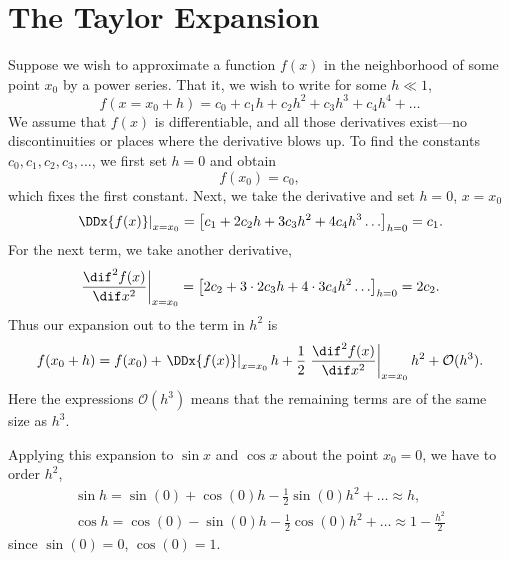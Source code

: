 \section{The Taylor Expansion}\label{s.taylor-expansion}
Suppose we wish to approximate a function $f(x)$ in the neighborhood of some point $x_{0}$ by a power series.  That it, we wish to write for some $h \ll 1$,
\[
 f(x = x_{0}+h) = c_{0} + c_{1} h + c_{2} h^{2} + c_{3} h^{3} + c_{4} h^{4}+ \ldots
\]
We assume that $f(x)$ is differentiable, and all those derivatives exist---no discontinuities or places where the derivative blows up.  To find the constants $c_{0}, c_{1}, c_{2}, c_{3}, \ldots$, we first set $h = 0$ and obtain
\[
	f(x_{0}) = c_{0},
\]
which fixes the first constant.  Next, we take the derivative and set $h = 0$, $x = x_{0}$
\[
\left.\DDx{f(x)}\right|_{x=x_{0}} = \left[c_{1} + 2c_{2} h + 3 c_{3}h^{2} + 4 c_{4} h^{3} \ldots\right]_{h= 0} = c_{1}.
\]
For the next term, we take another derivative,
\[
\left.\frac{\dif^{2}f(x)}{\dif x^{2}}\right|_{x=x_{0}} = \left[ 2c_{2} + 3\cdot 2 c_{3} h + 4\cdot 3 c_{4} h^{2}\ldots\right]_{h=0} = 2c_{2}.
\]
Thus our expansion out to the term in $h^{2}$ is
\[
 f(x_{0}+h) = f(x_{0}) + \left.\DDx{f(x)}\right|_{x=x_{0}} h + \frac{1}{2}\left.\frac{\dif^{2}f(x)}{\dif x^{2}}\right|_{x=x_{0}} h^{2} + \mathcal{O}(h^{3}).
\]
Here the expressions $\mathcal{O}(h^{3})$ means that the remaining terms are of the same size as $h^{3}$.

Applying this expansion to $\sin x$ and $\cos x$ about the point $x_{0} = 0$, we have to order $h^{2}$,
\begin{eqnarray}
	\sin h = \sin(0) + \cos(0)h - \frac{1}{2}\sin(0) h^{2} + \ldots 
		\approx h,\label{e.Taylor-sine}\\
	\cos h = \cos(0) - \sin(0) h - \frac{1}{2} \cos(0) h^{2} + \ldots
		\approx 1-\frac{h^{2}}{2}\label{e.Taylor-cosine}
\end{eqnarray}
since $\sin(0) = 0$, $\cos(0) = 1$.

